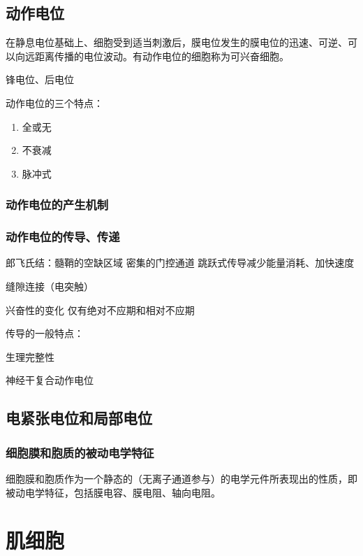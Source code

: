 \subsection{动作电位}

在静息电位基础上、细胞受到适当刺激后，膜电位发生的膜电位的迅速、可逆、可以向远距离传播的电位波动。有动作电位的细胞称为可兴奋细胞。

锋电位、后电位

动作电位的三个特点：
\begin{enumerate}
	\item 全或无
	\item 不衰减
	\item 脉冲式
\end{enumerate}

\subsubsection{动作电位的产生机制}

\subsubsection{动作电位的传导、传递}

郎飞氏结：髓鞘的空缺区域 密集的门控通道  跳跃式传导减少能量消耗、加快速度

缝隙连接（电突触）

兴奋性的变化 仅有绝对不应期和相对不应期

传导的一般特点：
\begin{description}
	\item[生理完整性] 
\end{description}

神经干复合动作电位

\subsection{电紧张电位和局部电位}

\subsubsection{细胞膜和胞质的被动电学特征}

细胞膜和胞质作为一个静态的（无离子通道参与）的电学元件所表现出的性质，即被动电学特征，包括膜电容、膜电阻、轴向电阻。





\section{肌细胞}



















